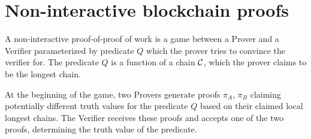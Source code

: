 \section{Non-interactive blockchain proofs}

A non-interactive proof-of-proof of work is a game between a Prover and a
Verifier parameterized by predicate $Q$ which the prover tries to convince the
verifier for. The predicate $Q$ is a function of a chain $\mathcal{C}$, which the
prover claims to be the longest chain.

At the beginning of the game, two Provers generate proofs $\pi_A$, $\pi_B$
claiming potentially different truth values for the predicate $Q$ based on
their claimed local longest chains. The Verifier receives these proofs and
accepts one of the two proofs, determining the truth value of the predicate.
